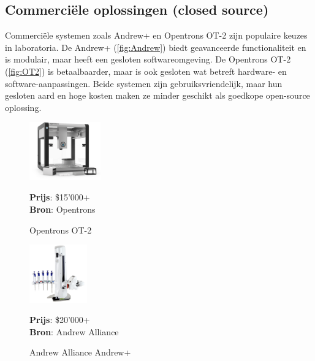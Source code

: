 \subsection{Commerciële oplossingen (closed source)}
Commerciële systemen zoals Andrew+ en Opentrons OT-2 zijn populaire keuzes in laboratoria. De Andrew+ (\autoref{fig:Andrew}) biedt geavanceerde functionaliteit en is modulair, maar heeft een gesloten softwareomgeving. De Opentrons OT-2 (\autoref{fig:OT2}) is betaalbaarder, maar is ook gesloten wat betreft hardware- en software-aanpassingen. Beide systemen zijn gebruiksvriendelijk, maar hun gesloten aard en hoge kosten maken ze minder geschikt als goedkope open-source oplossing.
\\[12pt]
\begin{minipage}[t]{0.49\textwidth}
    \vspace{0pt}
    \begin{figure}[H]
        \centering
        \captionsetup{width=0.85\textwidth}
        \includegraphics[height=2.5cm]{figures/opentronsot2.png}
        \caption{Opentrons OT-2}\label{fig:OT2}
        \textbf{Prijs}: \$15'000+\\
        \textbf{Bron}: Opentrons\ \cite{RN27}
    \end{figure}
\end{minipage}
\begin{minipage}[t]{0.49\textwidth}
    \vspace{0pt}
    \begin{figure}[H]
        \centering
        \captionsetup{width=0.85\textwidth}
        \includegraphics[height=2.5cm]{figures/Andrew-Alliance-liquid-handling-robot.png}
        \caption{Andrew Alliance Andrew+}\label{fig:Andrew}
        \textbf{Prijs}: \$20'000+ \\ 
        \textbf{Bron}: Andrew Alliance\ \cite{RN28}
    \end{figure}
\end{minipage}

